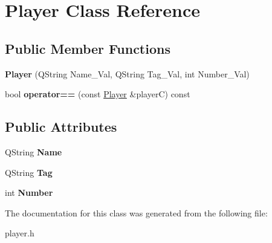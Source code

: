 \hypertarget{classPlayer}{\section{Player Class Reference}
\label{classPlayer}
}
\subsection*{Public Member Functions}
\begin{DoxyCompactItemize}
\item 
\hypertarget{classPlayer_a915010f972014f45848d1c211418ec42}{{\bfseries Player} (Q\-String Name\-\_\-\-Val, Q\-String Tag\-\_\-\-Val, int Number\-\_\-\-Val)}\label{classPlayer_a915010f972014f45848d1c211418ec42}

\item 
\hypertarget{classPlayer_a630f7472998f255377bb6bcb7b0e1932}{bool {\bfseries operator==} (const \hyperlink{classPlayer}{Player} \&player\-C) const }\label{classPlayer_a630f7472998f255377bb6bcb7b0e1932}

\end{DoxyCompactItemize}
\subsection*{Public Attributes}
\begin{DoxyCompactItemize}
\item 
\hypertarget{classPlayer_a9ffaa7b4cf8667a2a8de3e9cea51a8b5}{Q\-String {\bfseries Name}}\label{classPlayer_a9ffaa7b4cf8667a2a8de3e9cea51a8b5}

\item 
\hypertarget{classPlayer_ac55e5a1e2488281d11bc34d1141fda96}{Q\-String {\bfseries Tag}}\label{classPlayer_ac55e5a1e2488281d11bc34d1141fda96}

\item 
\hypertarget{classPlayer_a7152dbf1e4c28728e841f5b6a2ad755e}{int {\bfseries Number}}\label{classPlayer_a7152dbf1e4c28728e841f5b6a2ad755e}

\end{DoxyCompactItemize}


The documentation for this class was generated from the following file\-:\begin{DoxyCompactItemize}
\item 
player.\-h\end{DoxyCompactItemize}
